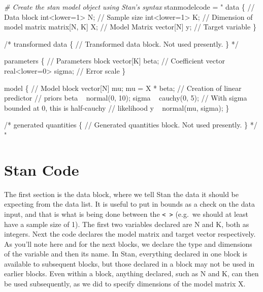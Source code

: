 \documentclass[]{book}
\newenvironment{Shaded}{\begin{snugshade}}{\end{snugshade}}
\newcommand{\CommentTok}[1]{\textcolor[rgb]{0.56,0.35,0.01}{\textit{#1}}}
\newcommand{\NormalTok}[1]{#1}
\newcommand{\StringTok}[1]{\textcolor[rgb]{0.31,0.60,0.02}{#1}}
\begin{document}
\begin{Shaded}
\begin{Highlighting}[]
\CommentTok{# Create the stan model object using Stan's syntax}
\NormalTok{stanmodelcode =}\StringTok{ "}
\StringTok{data \{                      // Data block}
\StringTok{  int<lower=1> N;           // Sample size}
\StringTok{  int<lower=1> K;           // Dimension of model matrix}
\StringTok{  matrix[N, K] X;           // Model Matrix}
\StringTok{  vector[N] y;              // Target variable}
\StringTok{\}}

\StringTok{/* }
\StringTok{transformed data \{          // Transformed data block. Not used presently.}
\StringTok{\} }
\StringTok{*/}

\StringTok{parameters \{                // Parameters block}
\StringTok{  vector[K] beta;           // Coefficient vector}
\StringTok{  real<lower=0> sigma;      // Error scale}
\StringTok{\}}

\StringTok{model \{                     // Model block}
\StringTok{  vector[N] mu;}
\StringTok{  mu = X * beta;            // Creation of linear predictor}
\StringTok{  }
\StringTok{  // priors}
\StringTok{  beta  ~ normal(0, 10);}
\StringTok{  sigma ~ cauchy(0, 5);     // With sigma bounded at 0, this is half-cauchy}
\StringTok{  }
\StringTok{  // likelihood}
\StringTok{  y ~ normal(mu, sigma);}
\StringTok{\}}

\StringTok{/*}
\StringTok{generated quantities \{      // Generated quantities block. Not used presently.}
\StringTok{\}}
\StringTok{*/}
\StringTok{"}
\end{Highlighting}
\end{Shaded}

\hypertarget{stan-code}{%
\section{Stan Code}\label{stan-code}}

The first section is the data block, where we tell Stan the data it should be expecting from the data list. It is useful to put in bounds as a check on the data input, and that is what is being done between the \texttt{\textless{}\ \textgreater{}} (e.g.~we should at least have a sample size of 1). The first two variables declared are N and K, both as integers. Next the code declares the model matrix and target vector respectively. As you'll note here and for the next blocks, we declare the type and dimensions of the variable and then its name. In Stan, everything declared in one block is available to subsequent blocks, but those declared in a block may not be used in earlier blocks. Even within a block, anything declared, such as N and K, can then be used subsequently, as we did to specify dimensions of the model matrix X.
\end{document}
